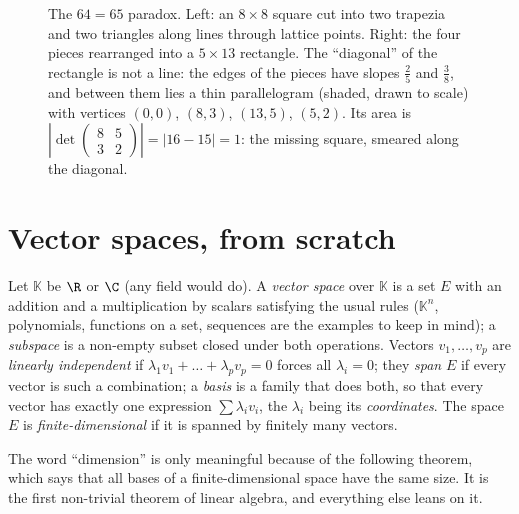 \begin{figure}[ht]
\centering
{}
\caption{The $64=65$ paradox. Left: an $8\times8$ square cut into two trapezia and two triangles along lines through lattice points. Right: the four pieces rearranged into a $5\times13$ rectangle. The ``diagonal'' of the rectangle is not a line: the edges of the pieces have slopes $\frac25$ and $\frac38$, and between them lies a thin parallelogram (shaded, drawn to scale) with vertices $(0,0)$, $(8,3)$, $(13,5)$, $(5,2)$. Its area is $\left|\det\begin{pmatrix}8&5\\3&2\end{pmatrix}\right|=|16-15|=1$: the missing square, smeared along the diagonal.}
\label{fig:chessboard}
\end{figure}


\section{Vector spaces, from scratch}

\begin{reminder}
Let $\mathbb K$ be $\R$ or $\C$ (any field would do). A \emph{vector space} over $\mathbb K$ is a set $E$ with an addition and a multiplication by
scalars satisfying the usual rules ($\mathbb K^n$, polynomials, functions on a set, sequences are the examples to keep in mind); a \emph{subspace} is a
non-empty subset closed under both operations. Vectors $v_1,\dots,v_p$ are \emph{linearly independent} if $\lambda_1v_1+\dots+\lambda_pv_p=0$
forces all $\lambda_i=0$; they \emph{span} $E$ if every vector is such a combination; a \emph{basis} is a family that does both, so that every vector
has exactly one expression $\sum\lambda_iv_i$, the $\lambda_i$ being its \emph{coordinates}. The space $E$ is \emph{finite-dimensional} if it is spanned by finitely many vectors.
\end{reminder}

The word ``dimension'' is only meaningful because of the following theorem, which says that all bases of a finite-dimensional space have the same size.
It is the first non-trivial theorem of linear algebra, and everything else leans on it.

